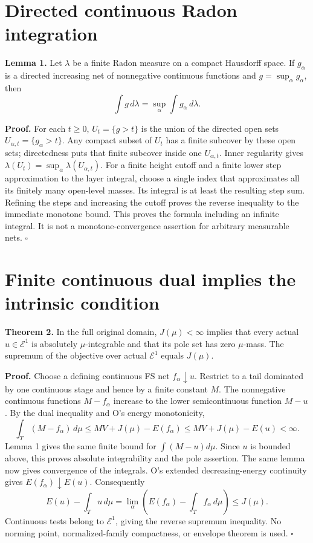 \documentclass[
  11pt,
]{article}
\begin{document}
\section{Directed continuous Radon
integration}\label{directed-continuous-radon-integration}

\textbf{Lemma 1.} Let \(\lambda\) be a finite Radon measure on a compact
Hausdorff space. If \(g_\alpha\) is a directed increasing net of
nonnegative continuous functions and \(g=\sup_\alpha g_\alpha\), then \[
 \int g\,d\lambda=\sup_\alpha\int g_\alpha\,d\lambda.
\]

\textbf{Proof.} For each \(t\geq0\), \(U_t=\{g>t\}\) is the union of the
directed open sets \(U_{\alpha,t}=\{g_\alpha>t\}\). Any compact subset
of \(U_t\) has a finite subcover by these open sets; directedness puts
that finite subcover inside one \(U_{\alpha,t}\). Inner regularity gives
\(\lambda(U_t)=\sup_\alpha\lambda(U_{\alpha,t})\). For a finite height
cutoff and a finite lower step approximation to the layer integral,
choose a single index that approximates all its finitely many open-level
masses. Its integral is at least the resulting step sum. Refining the
steps and increasing the cutoff proves the reverse inequality to the
immediate monotone bound. This proves the formula including an infinite
integral. It is not a monotone-convergence assertion for arbitrary
measurable nets. \(\square\)

\section{Finite continuous dual implies the intrinsic
condition}\label{finite-continuous-dual-implies-the-intrinsic-condition}

\textbf{Theorem 2.} In the full original domain, \(J(\mu)<\infty\)
implies that every actual \(u\in\mathcal E^1\) is absolutely
\(\mu\)-integrable and that its pole set has zero \(\mu\)-mass. The
supremum of the objective over actual \(\mathcal E^1\) equals
\(J(\mu)\).

\textbf{Proof.} Choose a defining continuous FS net
\(f_\alpha\downarrow u\). Restrict to a tail dominated by one continuous
stage and hence by a finite constant \(M\). The nonnegative continuous
functions \(M-f_\alpha\) increase to the lower semicontinuous function
\(M-u\). By the dual inequality and O's energy monotonicity, \[
 \int_T(M-f_\alpha)\,d\mu
 \leq MV+J(\mu)-E(f_\alpha)
 \leq MV+J(\mu)-E(u)<\infty.
\] Lemma 1 gives the same finite bound for \(\int(M-u)d\mu\). Since
\(u\) is bounded above, this proves absolute integrability and the pole
assertion. The same lemma now gives convergence of the integrals. O's
extended decreasing-energy continuity gives
\(E(f_\alpha)\downarrow E(u)\). Consequently \[
 E(u)-\int_Tu\,d\mu
   =\lim_\alpha\left(E(f_\alpha)-\int_Tf_\alpha\,d\mu\right)\leq J(\mu).
\] Continuous tests belong to \(\mathcal E^1\), giving the reverse
supremum inequality. No norming point, normalized-family compactness, or
envelope theorem is used. \(\square\)
\end{document}
